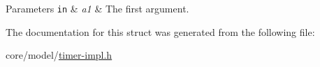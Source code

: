 \begin{DoxyParams}[1]{Parameters}
\mbox{\tt in}  & {\em a1} & The first argument. \\
\hline
\end{DoxyParams}


The documentation for this struct was generated from the following file\+:\begin{DoxyCompactItemize}
\item 
core/model/\hyperlink{timer-impl_8h}{timer-\/impl.\+h}\end{DoxyCompactItemize}
